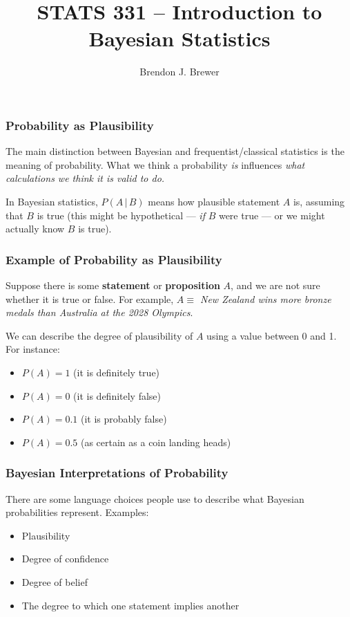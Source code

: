 \documentclass{beamer}
\author{Brendon J. Brewer}
\title{STATS 331 -- Introduction to Bayesian Statistics}
\institute{The University of Auckland}
\date{}
\newcommand{\given}{\,|\,}
\begin{document}
\frame{\titlepage}

\begin{frame}
\frametitle{Probability as Plausibility}
The main distinction between Bayesian and frequentist/classical statistics
is the meaning of probability. What we think a probability {\em is}
influences {\em what calculations we think it is valid to do.}\\[0.5em]\pause

In Bayesian statistics, $P(A \given B)$ means how plausible statement $A$ is,
assuming that $B$ is true (this might be hypothetical --- {\em if} $B$
were true --- or we might actually know $B$ is true).

\end{frame}



\begin{frame}
\frametitle{Example of Probability as Plausibility}
Suppose there is some {\bf statement}
or {\bf proposition} $A$, and we are not sure whether it is true or
false. For example, {\em $A \equiv$ New Zealand wins more bronze medals than
Australia at the 2028 Olympics}.\pause

We can describe the degree of plausibility of $A$ using a value between 0 and 1.
For instance:
\begin{itemize}
\item $P(A) = 1$ (it is definitely true) \\
\item $P(A) = 0$ (it is definitely false) \\
\item $P(A) = 0.1$ (it is probably false) \\
\item $P(A) = 0.5$ (as certain as a coin landing heads)
\end{itemize}

\end{frame}


\begin{frame}
\frametitle{Bayesian Interpretations of Probability}
There are some language choices people use to describe what
Bayesian probabilities represent. Examples:\pause

\begin{itemize}
\item Plausibility \pause
\item Degree of confidence \pause
\item Degree of belief \pause
\item The degree to which one statement implies another
\end{itemize}

\end{frame}
\end{document}
